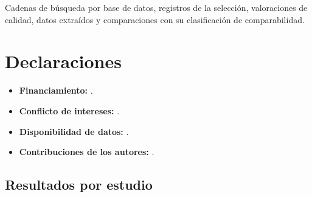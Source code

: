 \backmatter

 Cadenas de búsqueda por base de datos, registros de la selección, valoraciones de calidad, datos extraídos y comparaciones con su clasificación de comparabilidad. 

\section*{Declaraciones}

\begin{itemize}
\item \textbf{Financiamiento:} .
\item \textbf{Conflicto de intereses:} .
\item \textbf{Disponibilidad de datos:} .
\item \textbf{Contribuciones de los autores:} .
\end{itemize}

\begin{appendices}

\section{Resultados por estudio}\label{app:nucleo}



\end{appendices}
